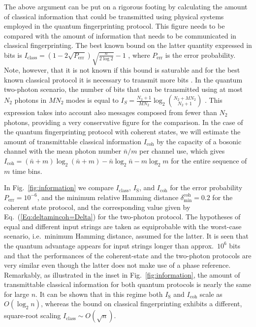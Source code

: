 \documentclass[10pt]{article}
\begin{document}
The above argument can be put on a rigorous footing by calculating the amount of classical information that could be transmitted using physical systems employed in the quantum fingerprinting protocol. This figure needs to be compared with the amount of information that needs to be communicated in  classical fingerprinting. The best known bound on the latter quantity expressed in bits is $I_{\textrm{class}}=(1-2\sqrt{P_{\text{err}}})\sqrt{\frac{n}{2\log 2}}-1$ \cite{Guan}, where $P_{\text{err}}$ is the error probability. Note, however, that it is not known if this bound is saturable and for the best known classical protocol it is necessary to transmit more bits \cite{Guan}. In the quantum two-photon scenario, the number of bits that can be transmitted using at most $N_2$ photons in $MN_2$ modes is equal to $I_{S}=\frac{N_2+1}{M N_2}\log_2{N_2+M N_2 \choose N_2+1}$ \cite{Caves}. This expression takes into account also messages composed from fewer than $N_2$ photons, providing a very conservative figure for the comparison.
In the case of the quantum fingerprinting protocol with coherent states, we will estimate the amount of transmittable classical information $I_{\text{coh}}$ by the capacity of a bosonic channel with the mean photon number $\bar{n}/m$ per channel use, which gives $I_{\text{coh}}=(\bar{n}+m)\log_2(\bar{n}+m)-\bar{n}\log_2\bar{n}-m\log_2 m$ for the entire sequence of $m$ time bins.

In Fig.~\ref{fig:information} we compare $I_{\textrm{class}}$, $I_{\textrm{S}}$, and $I_{\text{coh}}$ for the error probability $P_{\text{err}}=10^{-6}$, and the minimum relative Hamming distance $\delta^{\text{coh}}_{\text{min}}=0.2$ for the coherent state protocol, and the corresponding value given by Eq.~(\ref{Eq:deltamincoh=Delta}) for the two-photon protocol. The hypotheses of equal and different input strings are taken as equiprobable with the worst-case scenario, i.e.\ minimum Hamming distance, assumed for the latter. It is seen that the quantum advantage appears for input strings longer than approx.\ $10^{6}$ bits and that the performances of the coherent-state and the two-photon protocols are very similar even though the latter does not make use of a phase reference. Remarkably, as illustrated in the inset in Fig.~\ref{fig:information}, the amount of transmittable classical information for both quantum protocols is nearly the same for large $n$. It can be shown that in this regime both $I_{\textrm{S}}$ and $I_{\text{coh}}$ scale as $O(\log_2 n)$, whereas the bound on classical fingerprinting exhibits a different, square-root scaling $I_{\text{class}}\sim O(\sqrt{n})$.
\end{document}
